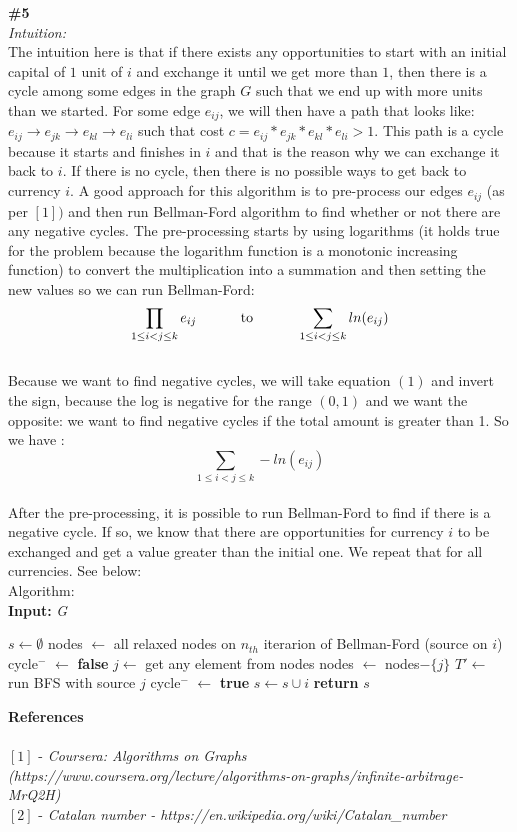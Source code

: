 \documentclass{article}
\newcommand\tab[1][1cm]{\hspace*{#1}}
\begin{document}
\textbf{\#5}
\\
\textit{Intuition:}
\\
The intuition here is that if there exists any opportunities to start with an initial capital of $1$ unit of $i$ and exchange it until we get more than $1$, then there is a cycle among some edges in the graph $G$ such that we end up with more units than we started. For some edge $e_{ij}$, we will then have a path that looks like: $e_{ij} \rightarrow e_{jk} \rightarrow e_{kl} \rightarrow e_{li}$ such that cost $c = e_{ij} * e_{jk} * e_{kl} * e_{li} > 1$.  This path is a cycle because it starts and finishes in $i$ and that is the reason why we can exchange it back to $i$. If there is no cycle, then there is no possible ways to get back to currency $i$. A good approach for this algorithm is to pre-process our edges $e_{ij}$ (as per $[1])$ and then run Bellman-Ford algorithm to find whether or not there are any negative cycles. The pre-processing starts by using logarithms (it holds true for the problem because the logarithm function is a monotonic increasing function) to convert the multiplication into a summation and then setting the new values so we can run Bellman-Ford: 
\begin{equation}
\prod_{1 \leq i < j \leq k} e_{ij}  \tab\text{ to }\tab \sum_{1 \leq i < j \leq k} ln(e_{ij}) 
\end{equation}
\\
Because we want to find negative cycles, we will take equation $(1)$ and invert the sign, because the log is negative for the range $(0, 1)$ and we want the opposite: we want to find negative cycles if the total amount is greater than 1. So we have :
\begin{equation}
\sum_{1 \leq i < j \leq k} - ln(e_{ij}) 
\end{equation}
\\
After the pre-processing, it is possible to run Bellman-Ford to find if there is a negative cycle. If so, we know that there are opportunities for currency $i$ to be exchanged and get a value greater than the initial one. We repeat that for all currencies. See below:
\\
Algorithm:\\
\textbf{Input:} \textit{G}
\begin{algorithmic}
\State $s \gets \emptyset$
  \State nodes $\gets$ all relaxed nodes on $n_{th}$ iterarion of Bellman-Ford (source on $i$)
  \State cycle$^{-}$ $\gets$ \textbf{false}
    \State $j \gets $ get any element from nodes
    \State nodes $\gets$ nodes$- \{j\}$
    \State $T' \gets $ run BFS with source $j$
      \State cycle$^{-}$ $\gets$ \textbf{true}
    \EndIf
  \EndWhile
    \State $s \gets s \cup {i}$
  \EndIf
\EndFor
\State \textbf{return} $s$
\end{algorithmic}
\textbf{References}
\\
\\ $[1]$ - \textit{Coursera: Algorithms on Graphs (https://www.coursera.org/lecture/algorithms-on-graphs/infinite-arbitrage-MrQ2H)}
\\ $[2]$ - \textit{Catalan number - https://en.wikipedia.org/wiki/Catalan\_number}
\end{document}

